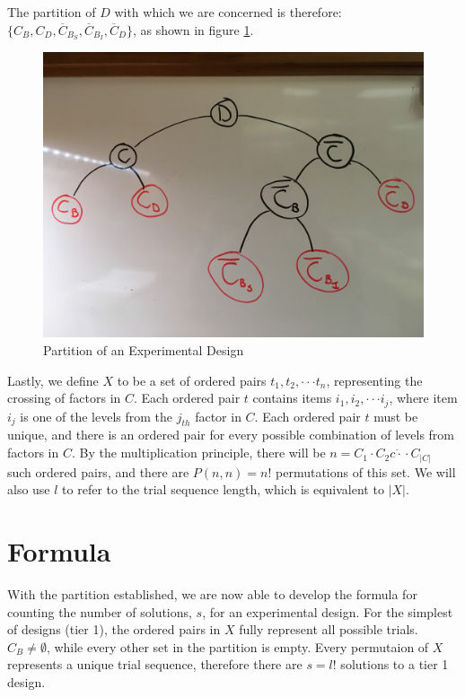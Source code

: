 The partition of $D$ with which we are concerned is therefore: $\{C_B, C_D, \overline{C}_{B_S}, \overline{C}_{B_I}, \overline{C}_D\}$, as shown in figure \ref{fig:partition}.

\begin{figure}[t]
\centering
\centerline{\includegraphics[origin=c,width=12cm]{../figures/partition.jpg}}
\caption{Partition of an Experimental Design}
\label{fig:partition}
\end{figure}

Lastly, we define $X$ to be a set of ordered pairs $t_1, t_2, \cdot\cdot\cdot t_n$, representing the crossing of factors in $C$. Each ordered pair $t$ contains items $i_1, i_2, \cdot\cdot\cdot i_j$, where item $i_j$ is one of the levels from the $j_{th}$ factor in $C$. Each ordered pair $t$ must be unique, and there is an ordered pair for every possible combination of levels from factors in $C$. By the multiplication principle, there will be $n = C_1 \cdot C_2 c\dot\cdot\cdot C_{|C|}$ such ordered pairs, and there are $P(n, n) = n!$ permutations of this set. We will also use $l$ to refer to the trial sequence length, which is equivalent to $|X|$.


\section{Formula}

With the partition established, we are now able to develop the formula for counting the number of solutions, $s$, for an experimental design. For the simplest of designs (tier 1), the ordered pairs in $X$ fully represent all possible trials. $C_B \neq \emptyset$, while every other set in the partition is empty. Every permutaion of $X$ represents a unique trial sequence, therefore there are $s = l!$ solutions to a tier 1 design.

